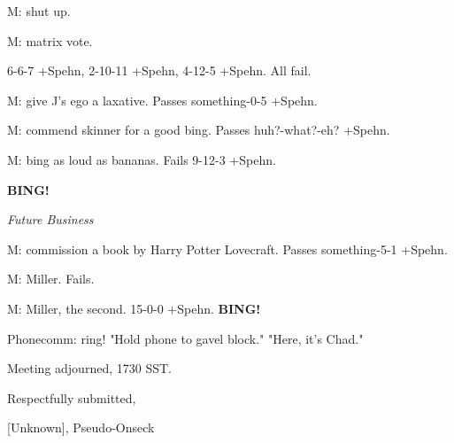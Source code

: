 \documentclass[12pt]{article}
\newcommand{\bing}{{\bf BING!} }
\newcommand{\goto}[1]{\bing \vskip 12pt \centerline{{\em{#1}}}}
\begin{document}
M: shut up.

M: matrix vote.

6-6-7 +Spehn, 2-10-11 +Spehn, 4-12-5 +Spehn. All fail.

M: give J's ego a laxative. Passes something-0-5 +Spehn.

M: commend skinner for a good bing. Passes huh?-what?-eh? +Spehn.

M: bing as loud as bananas. Fails 9-12-3 +Spehn.

\goto{Future Business}

M: commission a book by Harry Potter Lovecraft. Passes something-5-1 +Spehn.

M: Miller. Fails.

M: Miller, the second. 15-0-0 +Spehn. \bing

Phonecomm: ring! "Hold phone to gavel block." "Here, it's Chad."

\vspace{12pt}

\noindent
Meeting adjourned, 1730 SST.

\vspace{18pt}

\centerline{Respectfully submitted,}
\centerline{[Unknown], Pseudo-Onseck}
\end{document}
